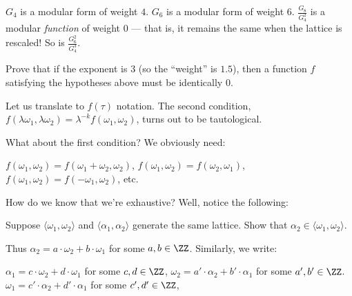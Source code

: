 \begin{example}
	\listhack
	\begin{itemize}
		\ii $G_4$ is a modular form of weight $4$.
		\ii $G_6$ is a modular form of weight $6$.
		\ii $\frac{G_8}{G_4^2}$ is a modular \emph{function} of weight $0$ ---
		that is, it remains the same when the lattice is rescaled!
		\ii So is $\frac{G_6^2}{G_4^3}$.
	\end{itemize}
\end{example}

\begin{exercise}
	Prove that if the exponent is $3$ (so the ``weight'' is $1.5$),
	then a function $f$ satisfying the hypotheses above must be identically $0$.
\end{exercise}

Let us translate to $f(\tau)$ notation.
The second condition, $f(\lambda \omega_1, \lambda \omega_2) = \lambda^{-k} f(\omega_1, \omega_2)$,
turns out to be tautological.

What about the first condition?
We obviously need:
\begin{itemize}
	\ii $f(\omega_1, \omega_2) = f(\omega_1+\omega_2, \omega_2)$,
	\ii $f(\omega_1, \omega_2) = f(\omega_2, \omega_1)$,
	\ii $f(\omega_1, \omega_2) = f(-\omega_1, \omega_2)$,
	\ii etc.
\end{itemize}

How do we know that we're exhaustive? Well, notice the following:
\begin{exercise}
	Suppose $\langle \omega_1, \omega_2 \rangle$ and $\langle \alpha_1, \alpha_2 \rangle$
	generate the same lattice. Show that $\alpha_2 \in \langle \omega_1, \omega_2 \rangle$.
\end{exercise}
Thus $\alpha_2 = a  \cdot \omega_2+b  \cdot \omega_1$ for some $a, b \in \ZZ$.
Similarly, we write:
\begin{itemize}
	\ii $\alpha_1 = c  \cdot \omega_2+d  \cdot \omega_1$ for some $c, d \in \ZZ$,
	\ii $\omega_2 = a' \cdot \alpha_2+b' \cdot \alpha_1$ for some $a', b' \in \ZZ$.
	\ii $\omega_1 = c' \cdot \alpha_2+d' \cdot \alpha_1$ for some $c', d' \in \ZZ$,
\end{itemize}

